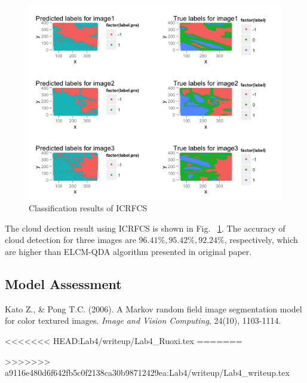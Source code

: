 \documentclass[english]{article}\usepackage{graphicx, color}
\numberwithin{equation}{section}
\numberwithin{figure}{section}
\begin{document}
\begin{figure}[!h]
  \begin{center}
    \includegraphics[width=\columnwidth]{figures/CRF.png}
  \end{center}
  \caption{Classification results of ICRFCS}
  \label{fig:ICRFCS}
\end{figure}

The cloud dection result using ICRFCS is shown in Fig. ~\ref{fig:ICRFCS}. The 
accuracy of cloud detection for three images are $96.41\%, 95.42\%, 92.24\%$, 
respectively, which are higher than ELCM-QDA algorithm presented in original 
paper.

\subsection{Model Assessment}



\begin{thebibliography}{9}

  Kato Z., \& Pong T.C. (2006).
  A Markov random field image segmentation model for color textured images.
  \emph{Image and Vision Computing}, 24(10), 1103-1114.

<<<<<<< HEAD:Lab4/writeup/Lab4_Ruoxi.tex
=======
\end{thebibliography}

>>>>>>> a9116e480d6f642fb5c0f2138ca30b98712429ea:Lab4/writeup/Lab4_writeup.tex
\end{document}
